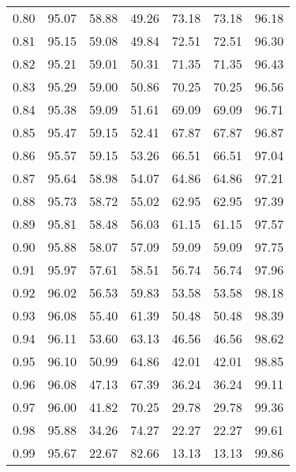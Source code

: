 \begin{tabular}{|c|c|c|c|c|c|c|}
      0.80 &     95.07 &     58.88 &      49.26 &   73.18 &      73.18 &         96.18 \\
      0.81 &     95.15 &     59.08 &      49.84 &   72.51 &      72.51 &         96.30 \\
      0.82 &     95.21 &     59.01 &      50.31 &   71.35 &      71.35 &         96.43 \\
      0.83 &     95.29 &     59.00 &      50.86 &   70.25 &      70.25 &         96.56 \\
      0.84 &     95.38 &     59.09 &      51.61 &   69.09 &      69.09 &         96.71 \\
      0.85 &     95.47 &     59.15 &      52.41 &   67.87 &      67.87 &         96.87 \\
      0.86 &     95.57 &     59.15 &      53.26 &   66.51 &      66.51 &         97.04 \\
      0.87 &     95.64 &     58.98 &      54.07 &   64.86 &      64.86 &         97.21 \\
      0.88 &     95.73 &     58.72 &      55.02 &   62.95 &      62.95 &         97.39 \\
      0.89 &     95.81 &     58.48 &      56.03 &   61.15 &      61.15 &         97.57 \\
      0.90 &     95.88 &     58.07 &      57.09 &   59.09 &      59.09 &         97.75 \\
      0.91 &     95.97 &     57.61 &      58.51 &   56.74 &      56.74 &         97.96 \\
      0.92 &     96.02 &     56.53 &      59.83 &   53.58 &      53.58 &         98.18 \\
      0.93 &     96.08 &     55.40 &      61.39 &   50.48 &      50.48 &         98.39 \\
      0.94 &     96.11 &     53.60 &      63.13 &   46.56 &      46.56 &         98.62 \\
      0.95 &     96.10 &     50.99 &      64.86 &   42.01 &      42.01 &         98.85 \\
      0.96 &     96.08 &     47.13 &      67.39 &   36.24 &      36.24 &         99.11 \\
      0.97 &     96.00 &     41.82 &      70.25 &   29.78 &      29.78 &         99.36 \\
      0.98 &     95.88 &     34.26 &      74.27 &   22.27 &      22.27 &         99.61 \\
      0.99 &     95.67 &     22.67 &      82.66 &   13.13 &      13.13 &         99.86 \\
\bottomrule
\end{tabular}
